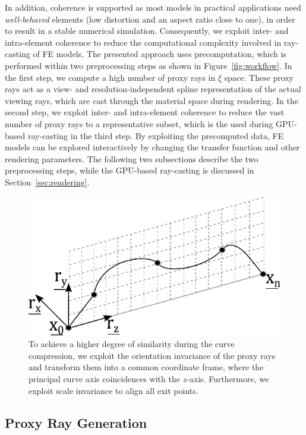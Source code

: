 \documentclass[review,journal]{vgtc}         %
\begin{document}
\noindent In addition, coherence is supported as most models in practical applications need {\it well-behaved} elements (low distortion and an aspect ratio close to one), in order to result in a stable numerical simulation. Consequently, we exploit inter- and intra-element coherence to reduce the computational complexity involved in ray-casting of FE models. The presented approach uses precomputation, which is performed within two preprocessing steps as shown in Figure~\ref{fig:workflow}. In the first step, we compute a high number of proxy rays in $\xi$ space. These proxy rays act as a view- and resolution-independent spline representation of the actual viewing rays, which are cast through the material space during rendering. In the second step, we exploit inter- and intra-element coherence to reduce the vast number of proxy rays to a representative subset, which is the used during GPU-based ray-casting in the third step. By exploiting the precomputed data, FE models can be explored interactively by changing the transfer function and other rendering parameters. The following two subsections describe the two preprocessing steps, while the GPU-based ray-casting is discussed in Section~\ref{sec:rendering}.

\begin{figure}[b]
	\centering
	\includegraphics[width=0.75\linewidth]{figures/splinetransformation}
	\caption{To achieve a higher degree of similarity during the curve compression, we exploit the orientation invariance of the proxy rays and transform them into a common coordinate frame, where the principal curve axis coincidences with the $z$-axis. Furthermore, we exploit scale invariance to align all exit points.}
	\label{fig:proxyrayalignment}
\end{figure}
\subsection{Proxy Ray Generation}\label{subsec:proxyraygeneration}
\end{document}
